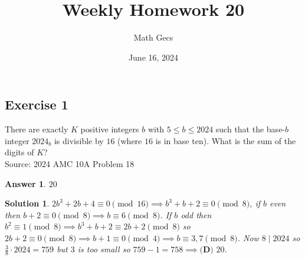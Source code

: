 \documentclass[12pt]{article}
\title{Weekly Homework 20}
\author{Math Gecs}
\date{June 16, 2024}
\newtheorem*{answer*}{Answer}
\newtheorem*{solution*}{Solution}
\begin{document}
\maketitle

\subsection*{Exercise 1}
There are exactly $K$ positive integers $b$ with $5 \leq b \leq 2024$ such that the base-$b$ integer $2024_b$ is divisible by $16$ (where $16$ is in base ten). What is the sum of the digits of $K$?\\

Source: 2024 AMC 10A Problem 18\\

\begin{answer*}
$\boxed{20}$
\end{answer*}

\begin{solution*}
$2b^3+2b+4\equiv 0\pmod{16}\implies b^3+b+2\equiv 0\pmod 8$, if $b$ even then $b+2\equiv 0\pmod 8\implies b\equiv 6\pmod 8$. If $b$ odd then $b^2\equiv 1\pmod 8\implies b^3+b+2\equiv 2b+2\pmod 8$ so $2b+2\equiv 0\pmod 8\implies b+1\equiv 0\pmod 4\implies b\equiv 3,7\pmod 8$. Now $8\mid 2024$ so $\frac38\cdot 2024=759$ but $3$ is too small so $759 - 1 = 758\implies\boxed{\textbf{(D) }20}$.
\end{solution*}
\end{document}
